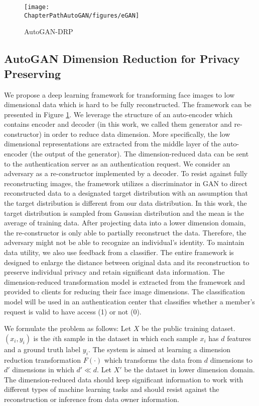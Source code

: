 

\begin{figure}
	\texttt{[image: \\ChapterPathAutoGAN/figures/eGAN]}
	\caption{AutoGAN-DRP}
	\label{fig:eGAN}
\end{figure}


\subsection{AutoGAN Dimension Reduction for Privacy Preserving}

We propose a deep learning framework for transforming face images to low dimensional data which is hard to be fully reconstructed. The framework can be presented in Figure \ref{fig:eGAN}. We leverage the structure of an auto-encoder \cite{Baldi2012} which contains encoder and decoder (in this work, we called them generator and re-constructor) in order to reduce data dimension. More specifically, the low dimensional representations are extracted from the middle layer of the auto-encoder (the output of the generator). The dimension-reduced data can be sent to the authentication server as an authentication request. We consider an adversary as a re-constructor implemented by a decoder. To resist against fully reconstructing images, the framework utilizes a discriminator in GAN \cite{Goodfellow2014} to direct reconstructed data to a designated target distribution with an assumption that the target distribution is different from our data distribution. In this work, the target distribution is sampled from Gaussian distribution and the mean is the average of training data. After projecting data into a lower dimension domain, the re-constructor is only able to partially reconstruct the data. Therefore, the adversary might not be able to recognize an individual's identity. To maintain data utility, we also use feedback from a classifier. The entire framework is designed to enlarge the distance between original data and its reconstruction to preserve individual privacy and retain significant data information. The dimension-reduced transformation model is extracted from the framework and provided to clients for reducing their face image dimensions. The classification model will be used in an authentication center that classifies whether a member's request is valid to have access (1) or not (0). 
 
We formulate the problem as follows:
Let $X$ be the public training dataset. $(x_i, y_i)$ is the $i$th sample in the dataset in which each sample $x_i$ has $d$ features and a ground truth label $y_i$. The system is aimed at learning a dimension reduction transformation $F(\cdot)$ which transforms the data from $d$ dimensions to $d'$ dimensions in which $d' \ll d $. Let $X'$ be the dataset in lower dimension domain. The dimension-reduced data should keep significant information to work with different types of machine learning tasks and should resist against the reconstruction or inference from data owner information.   

